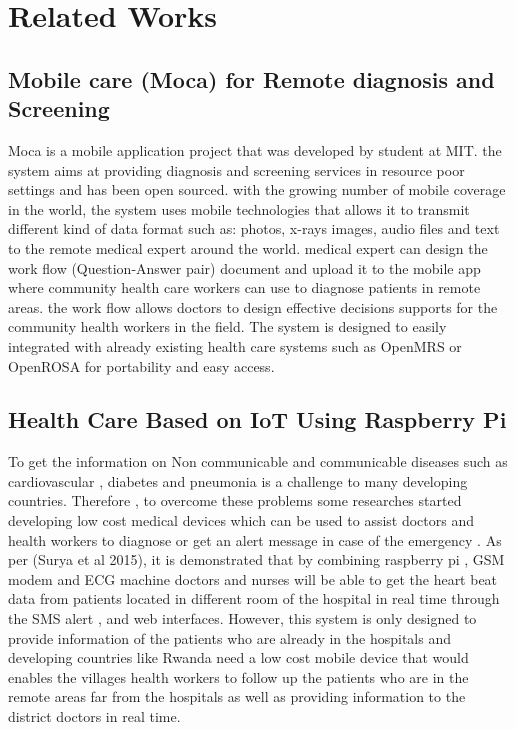 \chapter{Related Works}
\section{ Mobile care (Moca) for Remote diagnosis and Screening}
Moca is a mobile application project that was developed by student at MIT. the system aims at providing diagnosis and screening services in resource poor settings and has been open sourced. with the growing number of mobile coverage in the world, the system uses mobile technologies that allows it to transmit different kind of data format such as: photos, x-rays images, audio files and text to the remote medical expert around the world. medical expert can design the work flow (Question-Answer pair) document and upload it to the mobile app where community health care workers can use to diagnose patients in remote areas. the work flow allows doctors to design effective decisions supports for the community health workers in the field. The system is designed to easily integrated with already existing health care systems such as OpenMRS or OpenROSA for portability and easy access\cite{celi2009mobile}.

\section{Health Care Based on IoT Using Raspberry Pi }

To get the information on Non communicable and communicable diseases such as  cardiovascular , diabetes and pneumonia is a challenge to many developing countries. Therefore , to overcome these problems some researches  started developing low cost medical devices which can be used to assist doctors and health workers to diagnose  or get an alert message in case of the emergency . As per (Surya et al 2015), it is demonstrated that by combining raspberry pi , GSM modem and ECG machine doctors and nurses will be able to get  the  heart beat data from patients located in different room of the hospital  in real time through the SMS alert , and web interfaces. However, this system is only designed to provide information of the patients who are already in the hospitals and developing countries like Rwanda need  a  low cost  mobile device that would enables the villages health workers to  follow up the patients who are in the  remote areas far from the hospitals  as well as providing information to the district doctors in real time\cite{msuryadeekshithguptavamsikrishnapatchavavirginiamenezes2015}. 




